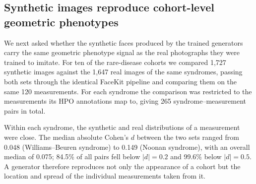 %
%

\subsection{Synthetic images reproduce cohort-level geometric phenotypes}

We next asked whether the synthetic faces produced by the trained generators
carry the same geometric phenotype signal as the real photographs they were
trained to imitate. For ten of the rare-disease cohorts we compared 1,727
synthetic images against the 1,647 real images of the same syndromes, passing
both sets through the identical FaceKit pipeline and comparing them on the same
120 measurements. For each syndrome the comparison was restricted to the
measurements its HPO annotations map to, giving 265 syndrome--measurement pairs
in total.

Within each syndrome, the synthetic and real distributions of a measurement were
close. The median absolute Cohen's $d$ between the two sets ranged from 0.048
(Williams--Beuren syndrome) to 0.149 (Noonan syndrome), with an overall
median of 0.075; 84.5\% of all pairs fell below $|d| = 0.2$ and 99.6\% below
$|d| = 0.5$. A generator therefore reproduces not only the appearance of a
cohort but the location and spread of the individual measurements taken from it.

